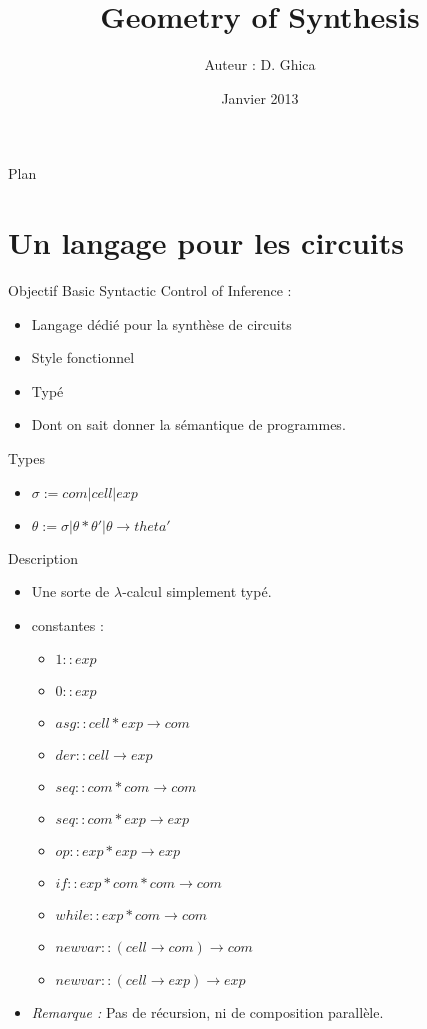 \documentclass{beamer}
\title{Geometry of Synthesis}
\author[Thomas Bourgeat]{Auteur : D. Ghica}
\date{Janvier 2013}
\begin{document}
\begin{frame}
  \titlepage
\end{frame}

\begin{frame}{Plan}
  \tableofcontents
\end{frame}

\section{Un langage pour les circuits}

\begin{frame}{Objectif}
Basic Syntactic Control of Inference :
\begin{itemize}
\item Langage dédié pour la synthèse de circuits
\item Style fonctionnel
\item Typé
\item Dont on sait donner la sémantique de programmes.
\end{itemize}
\end{frame}

\begin{frame}{Types}
\begin{itemize}
\item $\sigma := com | cell | exp$
\item $\theta := \sigma | \theta * \theta' | \theta \rightarrow theta'$
\end{itemize}
\end{frame}

\begin{frame}{Description}
\begin{itemize}
\item Une sorte de $\lambda$-calcul simplement typé.
\item constantes :
\begin{itemize}
\item $1 :: exp$
\item $0 :: exp$
\item $asg :: cell * exp \rightarrow com$
\item $der :: cell \rightarrow exp$
\item $seq :: com * com \rightarrow com$
\item $seq :: com * exp \rightarrow exp$
\item $op :: exp * exp \rightarrow exp$
\item $if :: exp * com * com \rightarrow com$
\item $while :: exp * com \rightarrow com$
\item $newvar :: (cell \rightarrow com) \rightarrow com$
\item $newvar :: (cell \rightarrow exp) \rightarrow exp$ 
\end{itemize}
\item \emph{Remarque :} Pas de récursion, ni de composition parallèle.
\end{itemize}
\end{frame}
\end{document}
